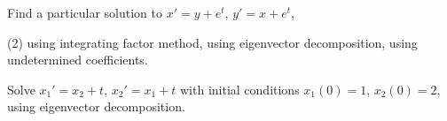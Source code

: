 \begin{exercise}
Find a particular solution to $x' = y + e^t$, $y' = x +e^t$,
\begin{tasks}(2)
\task using integrating factor method,
\task using eigenvector decomposition,
\task using undetermined coefficients.
\end{tasks}
\end{exercise}

\begin{exercise}
Solve
$x_1' = x_2 + t$, $x_2' = x_1 +t$ with initial conditions
$x_1(0) = 1$, $x_2(0) = 2$,
using eigenvector decomposition.
\end{exercise}

